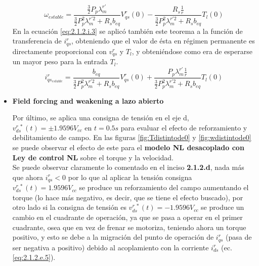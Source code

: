 \documentclass[10pt]{article}
\begin{document}
\begin{itemize}
	\begin{equation}
	\omega_{estable}=\frac{\frac{3}{2}P_{p}\lambda^{r'}_{m}}{\frac{3}{2}P^{2}_{p}\lambda^{r'2}_{m}+ R_{s}b_{eq}}V^{r}_{qs}(0) -  \frac{R_{s} \frac{1}{r}}{\frac{3}{2}P^{2}_{p}\lambda^{r'2}_{m}+ R_{s}b_{eq}}T_{l}(0)
	\label{eq:2.1.2.i.2}
	\end{equation}
	En la ecuación \ref{eq:2.1.2.i.3} se aplicó también este teorema a la función de transferencia de $i^{r}_{qs}$, obteniendo que el valor de ésta en régimen permanente es directamente proporcional con $v^{r}_{qs}$ y $T_{l}$, y obteniéndose como era de esperarse un mayor peso para la entrada $T_{l}$.
	\begin{equation}
	i^{r}_{qs_{estable}}=\frac{b_{eq}}{\frac{3}{2}P^{2}_{p}\lambda^{r'2}_{m}+ R_{s}b_{eq}}V^{r}_{qs}(0) +  \frac{P_{p}\lambda^{r'}_{m} \frac{1}{r}}{\frac{3}{2}P^{2}_{p}\lambda^{r'2}_{m}+ R_{s}b_{eq}}T_{l}(0)
	\label{eq:2.1.2.i.3}
	\end{equation}
	
	\item \textbf{Field forcing and weakening a lazo abierto}
	
	Por último, se aplica una consigna de tensión en el eje d, $v^{r \ *}_{ds}(t)=\pm 1.9596 V_{cc}$ en $t=0.5 s$ para evaluar el efecto de reforzamiento y debilitamiento de campo. En las figuras \ref{fig:Tdistintode0} y \ref{fig:wdistintode0} se puede observar el efecto de este para el \textbf{modelo NL desacoplado con Ley de control NL} sobre el torque y la velocidad.\\
	Se puede observar claramente lo comentado en el inciso \textbf{2.1.2.d}, nada más que ahora $i^{r}_{qs}<0$ por lo que al aplicar la tensión consigna $v^{r \ *}_{ds}(t)= 1.9596 V_{cc}$ se produce un reforzamiento del campo aumentando el torque (lo hace más negativo, es decir, que se tiene el efecto buscado), por otro lado si la consigna de tensión es  $v^{r \ *}_{ds}(t)= -1.9596 V_{cc}$ se produce un cambio en el cuadrante de operación, ya que se pasa a operar en el primer cuadrante, osea que en vez de frenar se motoriza, teniendo ahora un torque positivo, y esto se debe a la migración del punto de operación de $i^{r}_{qs}$ (pasa de ser negativa a positivo) debido al acoplamiento con la corriente $i^{r}_{ds}$ (ec. \ref{eq:2.1.2.e.5}).
	

\end{itemize}
\end{document}
